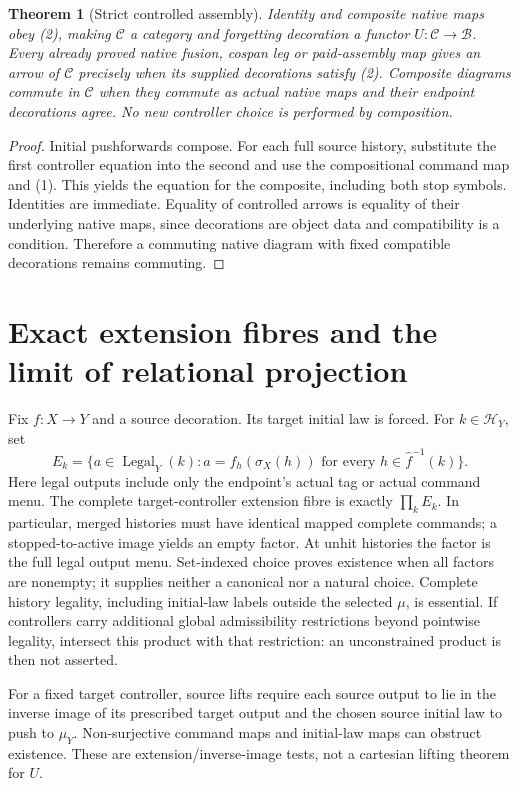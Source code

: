 \documentclass[11pt]{article}
\newtheorem{theorem}{Theorem}
\begin{document}
\begin{theorem}[Strict controlled assembly]
Identity and composite native maps obey (2), making $\mathcal C$ a category and forgetting decoration a functor $U:\mathcal C\to\mathcal B$. Every already proved native fusion, cospan leg or paid-assembly map gives an arrow of $\mathcal C$ precisely when its supplied decorations satisfy (2). Composite diagrams commute in $\mathcal C$ when they commute as actual native maps and their endpoint decorations agree. No new controller choice is performed by composition.
\end{theorem}
\begin{proof}
Initial pushforwards compose. For each full source history, substitute the first controller equation into the second and use the compositional command map and (1). This yields the equation for the composite, including both stop symbols. Identities are immediate. Equality of controlled arrows is equality of their underlying native maps, since decorations are object data and compatibility is a condition. Therefore a commuting native diagram with fixed compatible decorations remains commuting.\end{proof}

\section{Exact extension fibres and the limit of relational projection}
Fix $f:X\to Y$ and a source decoration. Its target initial law is forced. For $k\in\mathcal H_Y$, set
\[
 E_k=\{a\in\operatorname{Legal}_Y(k):
       a=f_h(\sigma_X(h))\text{ for every }h\in\widehat f^{-1}(k)\}. \tag{3}
\]
Here legal outputs include only the endpoint's actual tag or actual command menu. The complete target-controller extension fibre is exactly $\prod_k E_k$. In particular, merged histories must have identical mapped complete commands; a stopped-to-active image yields an empty factor. At unhit histories the factor is the full legal output menu. Set-indexed choice proves existence when all factors are nonempty; it supplies neither a canonical nor a natural choice. Complete history legality, including initial-law labels outside the selected $\mu$, is essential. If controllers carry additional global admissibility restrictions beyond pointwise legality, intersect this product with that restriction: an unconstrained product is then not asserted.

For a fixed target controller, source lifts require each source output to lie in the inverse image of its prescribed target output and the chosen source initial law to push to $\mu_Y$. Non-surjective command maps and initial-law maps can obstruct existence. These are extension/inverse-image tests, not a cartesian lifting theorem for $U$.
\end{document}
